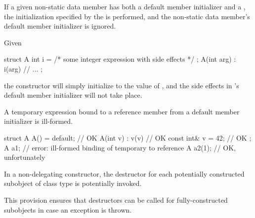 \pnum
If a given non-static data member has both a default member initializer
and a , the initialization specified by the
 is performed, and the non-static data member's
default member initializer is ignored.
\begin{example}
Given
\begin{codeblock}
struct A {
  int i = /* some integer expression with side effects */ ;
  A(int arg) : i(arg) { }
  // ...
};
\end{codeblock}
the  constructor will simply initialize  to the value of
, and the
%
side effects in 's default member initializer
will not take place.
\end{example}

\pnum
A temporary expression bound to a reference member from a
default member initializer is ill-formed.
\begin{example}
\begin{codeblock}
struct A {
  A() = default;        // OK
  A(int v) : v(v) { }   // OK
  const int& v = 42;    // OK
};
A a1;                   // error: ill-formed binding of temporary to reference
A a2(1);                // OK, unfortunately
\end{codeblock}
\end{example}

\pnum
In a non-delegating constructor, the destructor for each potentially constructed
subobject of class type is potentially invoked.
\begin{note}
This provision ensures that destructors can be called for fully-constructed
subobjects in case an exception is thrown.
\end{note}

